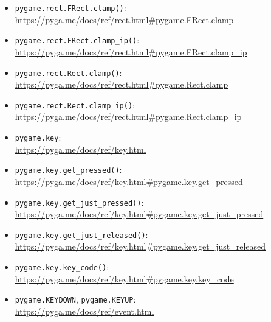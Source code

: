 \begin{pygbox}
\begin{itemize}
  \item \texttt{pygame.rect.FRect.clamp()}:
  \\
   \url{https://pyga.me/docs/ref/rect.html#pygame.FRect.clamp}

  \item \texttt{pygame.rect.FRect.clamp\_ip()}:
  \\
  \url{https://pyga.me/docs/ref/rect.html#pygame.FRect.clamp_ip}

  \item \texttt{pygame.rect.Rect.clamp()}:
  \\
  \url{https://pyga.me/docs/ref/rect.html#pygame.Rect.clamp}

	\item \texttt{pygame.rect.Rect.clamp\_ip()}:
	\\
	\url{https://pyga.me/docs/ref/rect.html#pygame.Rect.clamp_ip}

	\item \texttt{pygame.key}:
	\\ 
	\url{https://pyga.me/docs/ref/key.html}

	\item \texttt{pygame.key.get\_pressed()}:
	\\ 
	\url{https://pyga.me/docs/ref/key.html#pygame.key.get_pressed}

	\item \texttt{pygame.key.get\_just\_pressed()}:
	\\ 
	\url{https://pyga.me/docs/ref/key.html#pygame.key.get_just_pressed}

	\item \texttt{pygame.key.get\_just\_released()}:
	\\ 
	\url{https://pyga.me/docs/ref/key.html#pygame.key.get_just_released}

	\item \texttt{pygame.key.key\_code()}:
	\\ 
	\url{https://pyga.me/docs/ref/key.html#pygame.key.key_code}

	\item \texttt{pygame.KEYDOWN}, \texttt{pygame.KEYUP}:
	\\ 
	\url{https://pyga.me/docs/ref/event.html}
	
\end{itemize}
\end{pygbox}


